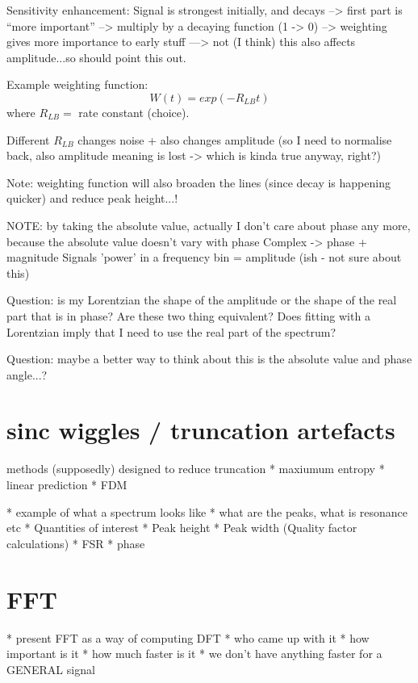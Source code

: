 Sensitivity enhancement:
Signal is strongest initially, and decays
--> first part is ``more important''   --> multiply by a decaying function (1 -> 0)
--> weighting gives more importance to early stuff
---> not (I think) this also affects amplitude...so should point this out.

Example weighting function:
$$
W(t) = exp(-R_{LB} t)
$$
where $R_{LB} = $  rate constant (choice).

Different $R_{LB}$ changes noise + also changes amplitude (so I need to
normalise back, also amplitude meaning is lost -> which is kinda true anyway, right?)

Note: weighting function will also broaden the lines (since decay is happening
quicker) and reduce peak height...!

NOTE: by taking the absolute value, actually I don't care about phase any more,
because the absolute value doesn't vary with phase
Complex -> phase + magnitude
Signals 'power' in a frequency bin = amplitude (ish - not sure about this)

Question: is my Lorentzian the shape of the amplitude or the shape of the real
part that is in phase? Are these two thing equivalent? Does fitting with a
Lorentzian imply that I need to use the real part of the spectrum?

Question: maybe a better way to think about this is the absolute value and phase angle...?

\section{sinc wiggles / truncation artefacts}

methods (supposedly) designed to reduce truncation
* maxiumum entropy
* linear prediction
* FDM


* example of what a spectrum looks like
* what are the peaks, what is resonance etc
* Quantities of interest
  * Peak height
  * Peak width (Quality factor calculations)
  * FSR
  * phase

\section{FFT}
* present FFT as a way of computing DFT
* who came up with it
* how important is it
* how much faster is it
* we don't have anything faster for a GENERAL signal

